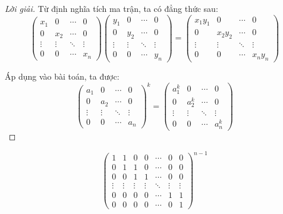 \documentclass[class=linearalgebra,crop=false]{standalone}
\begin{document}
\begin{proof}[Lời giải]
    Từ định nghĩa tích ma trận, ta có đẳng thức sau:
    \[
        \begin{pmatrix}
            x_{1}  & 0      & \cdots & 0      \\
            0      & x_{2}  & \cdots & 0      \\
            \vdots & \vdots & \ddots & \vdots \\
            0      & 0      & \cdots & x_{n}
        \end{pmatrix}
        \begin{pmatrix}
            y_{1}  & 0      & \cdots & 0      \\
            0      & y_{2}  & \cdots & 0      \\
            \vdots & \vdots & \ddots & \vdots \\
            0      & 0      & \cdots & y_{n}
        \end{pmatrix}
        =
        \begin{pmatrix}
            x_{1}y_{1}  & 0      & \cdots & 0      \\
            0      & x_{2}y_{2}  & \cdots & 0      \\
            \vdots & \vdots & \ddots & \vdots \\
            0      & 0      & \cdots & x_{n}y_{n}
        \end{pmatrix}
    \]
    \par Áp dụng vào bài toán, ta được:
    \[
        \begin{pmatrix}
            a_{1}  & 0      & \cdots & 0      \\
            0      & a_{2}  & \cdots & 0      \\
            \vdots & \vdots & \ddots & \vdots \\
            0      & 0      & \cdots & a_{n}
        \end{pmatrix}^{k}
        =
        \begin{pmatrix}
            a^{k}_{1}  & 0      & \cdots & 0      \\
            0      & a^{k}_{2}  & \cdots & 0      \\
            \vdots & \vdots & \ddots & \vdots \\
            0      & 0      & \cdots & a^{k}_{n}
        \end{pmatrix}
    \]
\end{proof}

\begin{exercise}
    \[
        \begin{pmatrix}
            1 & 1 & 0 & 0 & \cdots & 0 & 0 \\
            0 & 1 & 1 & 0 & \cdots & 0 & 0 \\
            0 & 0 & 1 & 1 & \cdots & 0 & 0 \\
            \vdots & \vdots & \vdots & \vdots & \ddots & \vdots & \vdots \\
            0 & 0 & 0 & 0 & \cdots & 1 & 1 \\
            0 & 0 & 0 & 0 & \cdots & 0 & 1
        \end{pmatrix}^{n-1}
    \]
\end{exercise}
\end{document}
